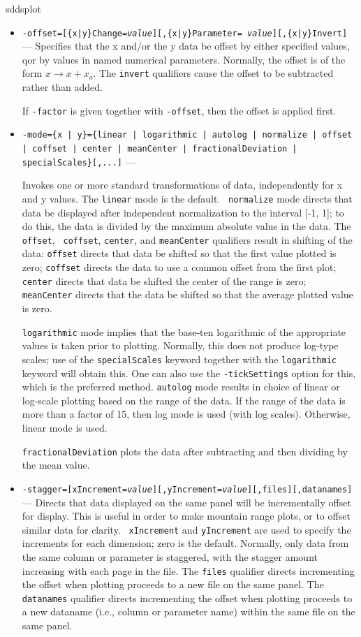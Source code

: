 \begin{sddsprog}{sddsplot}
\begin{itemize}
\begin{itemize}
  \item {\tt -offset=[\{x|y\}Change={\em value}][,\{x|y\}Parameter={\em
value}][,\{x|y\}Invert]} --- Specifies that the x and/or the y data be
offset by either specified values, qor by values in named numerical
parameters.  Normally, the offset is of the form $x \rightarrow
x+x_o$.  The {\tt invert} qualifiers cause the offset to be subtracted
rather than added.

If {\tt -factor} is given together with {\tt -offset}, then the offset is applied first.

  \item {\tt -mode=\{x | y\}=\{linear | logarithmic | autolog | normalize | offset | coffset | center | meanCenter | fractionalDeviation | specialScales\}[,...]} ---

Invokes one or more standard transformations of data, independently
for x and y values.  The {\tt linear} mode is the default.  {\tt
normalize} mode directs that data be displayed after independent
normalization to the interval [-1, 1]; to do this, the data is divided
by the maximum absolute value in the data.  The {\tt offset}, {\tt
coffset}, {\tt center}, and {\tt meanCenter} qualifiers result in 
shifting of the data: {\tt offset} directs that data be shifted so 
that the first value plotted is zero; {\tt coffset} directs the data 
to use a common offset from the first plot; {\tt center} directs that 
data be shifted the center of the range is zero; {\tt meanCenter} 
directs that the data be shifted so that the average plotted value 
is zero.

{\tt logarithmic} mode implies that the base-ten logarithmic of the
appropriate values is taken prior to plotting.  Normally, this does
not produce log-type scales; use of the {\tt specialScales} keyword
together with the {\tt logarithmic} keyword will obtain this. One can
also use the {\tt -tickSettings} option for this, which is the preferred
method.  {\tt autolog} mode results in choice of linear or log-scale plotting
based on the range of the data.  If the range of the data is more than a factor
of 15, then log mode is used (with log scales).  Otherwise, linear mode is used.

{\tt fractionalDeviation} plots the data after subtracting and then dividing by the mean value.

\item {\tt -stagger=[xIncrement={\em value}][,yIncrement={\em value}][,files][,datanames]} ---
Directs that data displayed on the same panel will be incrementally offset for display.  This is
useful in order to make mountain range plots, or to offset similar data for clarity.  {\tt
xIncrement} and {\tt yIncrement} are used to specify the increments for each dimension; zero is the
default.  Normally, only data from the same column or parameter is staggered, with the stagger amount
increasing with each page in the file.  The {\tt files} qualifier directs incrementing the offset
when plotting proceeds to a new file on the same panel.  The {\tt datanames} qualifier directs
incrementing the offset when plotting proceeds to a new dataname (i.e., column or parameter name)
within the same file on the same panel.


\end{itemize}
\end{itemize}
\end{sddsprog}
